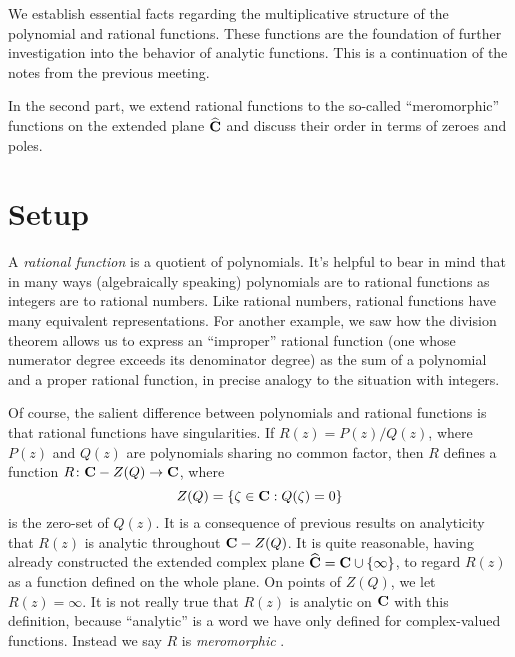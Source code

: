 \documentclass[twocolumn,12pt]{article}
\date{April 1, 2013 (Mon)}
\begin{document}
\makeheader

\begin{summary}

  We establish essential facts regarding the multiplicative structure of the polynomial and rational functions. These functions are the foundation of further investigation into the behavior of analytic functions. This is a continuation of the notes from the previous meeting.

  In the second part, we extend rational functions to the so-called ``meromorphic'' functions on the extended plane $\widehat{\mathbf{C}}$ and discuss their order in terms of zeroes and poles.

\end{summary}

\section{Setup}

A \emph{rational function} is a quotient of polynomials. It's helpful to bear in mind that in many ways (algebraically speaking) polynomials are to rational functions as integers are to rational numbers. Like rational numbers, rational functions have many equivalent representations. For another example, we saw how the division theorem allows us to express an ``improper'' rational function (one whose numerator degree exceeds its denominator degree) as the sum of a polynomial and a proper rational function, in precise analogy to the situation with integers.

Of course, the salient difference between polynomials and rational functions is that rational functions have singularities. If $R(z) = P(z)/Q(z)$, where $P(z)$ and $Q(z)$ are polynomials sharing no common factor, then $R$ defines a function $R \colon \mathbf{C} - Z(Q) \to \mathbf{C}$, where
\[
  Z(Q) = \{ \zeta \in \mathbf{C} : Q(\zeta) = 0 \}
\]
is the zero-set of $Q(z)$. It is a consequence of previous results on analyticity that $R(z)$ is analytic throughout $\mathbf{C} - Z(Q)$. It is quite reasonable, having already constructed the extended complex plane $\widehat{\mathbf{C}} = \mathbf{C} \cup \{ \infty \}$, to regard $R(z)$ as a function defined on the whole plane. On points of $Z(Q)$, we let $R(z) = \infty$. It is not really true that $R(z)$ is analytic on $\mathbf{C}$ with this definition, because ``analytic'' is a word we have only defined for complex-valued functions. Instead we say $R$ is \emph{meromorphic}%
.
\end{document}
